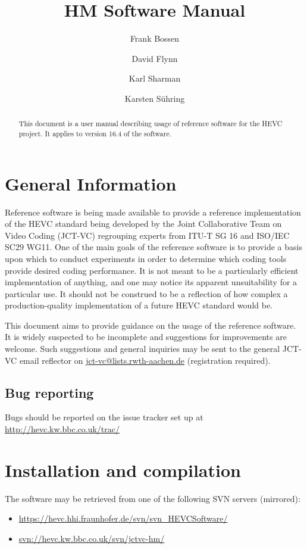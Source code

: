 \documentclass[a4paper,11pt]{jctvcdoc}
\title{HM Software Manual}
\author{%
	Frank Bossen
	\email{frank@bossentech.com}
	\and
	David Flynn
	\email{dflynn@blackberry.com}
	\and
  Karl Sharman
	\email{karl.sharman@eu.sony.com}
	\and
	Karsten S\"uhring
	\email{karsten.suehring@hhi.fraunhofer.de}
}
\begin{document}
\maketitle
\begin{abstract}
This document is a user manual describing usage of reference software
for the HEVC project. It applies to version 16.4
of the software.
\end{abstract}

\tableofcontents
\listoftables



\section{General Information}
Reference software is being made available to provide a reference
implementation of the HEVC standard being developed by the Joint
Collaborative Team on Video Coding (JCT-VC) regrouping experts from
ITU-T SG 16 and ISO/IEC SC29 WG11. One of the main goals of the
reference software is to provide a basis upon which to conduct
experiments in order to determine which coding tools provide desired
coding performance. It is not meant to be a particularly efficient
implementation of anything, and one may notice its apparent
unsuitability for a particular use. It should not be construed to be a
reflection of how complex a production-quality implementation of a
future HEVC standard would be.

This document aims to provide guidance on the usage of the reference
software. It is widely suspected to be incomplete and suggestions for
improvements are welcome. Such suggestions and general inquiries may be
sent to the general JCT-VC email reflector on
\url{jct-vc@lists.rwth-aachen.de} (registration required).

\subsection*{Bug reporting}
Bugs should be reported on the issue tracker set up at
\url{http://hevc.kw.bbc.co.uk/trac/}

\section{Installation and compilation}
The software may be retrieved from one of the following SVN servers
(mirrored):
\begin{itemize}
\item \url{https://hevc.hhi.fraunhofer.de/svn/svn_HEVCSoftware/}
\item \url{svn://hevc.kw.bbc.co.uk/svn/jctvc-hm/}
\end{itemize}
\end{document}
